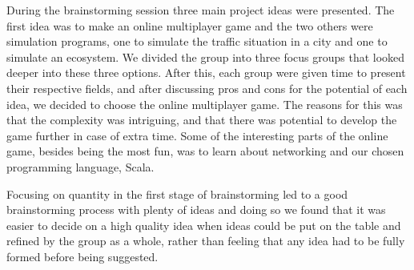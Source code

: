 \documentclass[a4paper]{article}
\begin{document}
During the brainstorming session three main project ideas were presented. The first idea was to make an online multiplayer game and the two others were simulation programs, one to simulate the traffic situation in a city and one to simulate an ecosystem. We divided the group into three focus groups that looked deeper into these three options. After this, each group were given time to present their respective fields, and after discussing pros and cons for the potential of each idea, we decided to choose the online multiplayer game. The reasons for this was that the complexity was intriguing, and that there was potential to develop the game further in case of extra time. Some of the interesting parts of the online game, besides being the most fun, was to learn about networking and our chosen programming language, Scala. 

Focusing on quantity in the first stage of brainstorming led to a good brainstorming process with plenty of ideas and doing so we found that it was easier to decide on a high quality idea when ideas could be put on the table and refined by the group as a whole, rather than feeling that any idea had to be fully formed before being suggested.
\newpage
\end{document}
